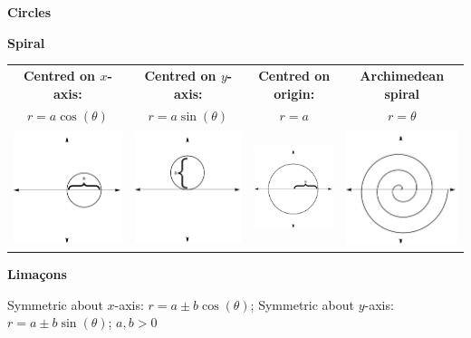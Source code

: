 \noindent\parbox{3\gallerywidth+37pt}{\textbf{\large Circles}}\textbf{\large Spiral}\\


\begin{tabular}{cccc}
\textbf{Centred on $x$-axis:} & \textbf{Centred on $y$-axis:} & \textbf{Centred on origin:} &\textbf{Archimedean spiral}\\
$r=a\cos (\theta)$ & $r=a\sin(\theta)$ & $r=a$ & $r=\theta$\\
\includegraphics[width=.22\textwidth]{fig_parametric_9a}&\includegraphics[width=.22\textwidth]{fig_parametric_9b}&\includegraphics[width=.22\textwidth]{fig_parametric_9c}&\includegraphics[width=.22\textwidth]{fig_parametric_9d}
\end{tabular}

\pagebreak
\noindent\textbf{\large Lima\c cons}\\

\parbox{4\gallerywidth}{Symmetric about $x$-axis: $r=a\pm b\cos(\theta)$; \quad Symmetric about $y$-axis:  $r=a\pm b\sin (\theta)$; \quad $a,b>0$}\\


